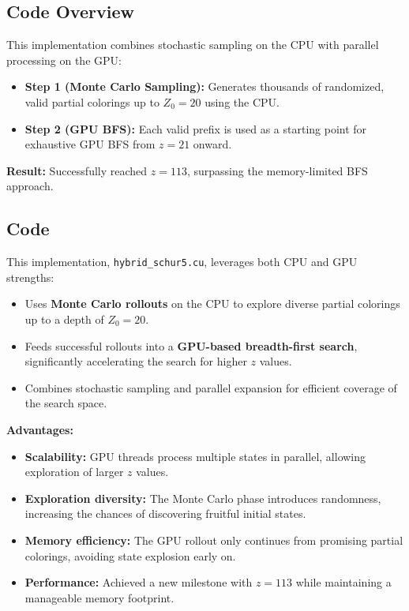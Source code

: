 \documentclass[12pt]{article}
\begin{document}
\subsection*{Code Overview}
This implementation combines stochastic sampling on the CPU with parallel processing on the GPU:
\begin{itemize}
    \item \textbf{Step 1 (Monte Carlo Sampling):} Generates thousands of randomized, valid partial colorings up to $Z_0 = 20$ using the CPU.
    \item \textbf{Step 2 (GPU BFS):} Each valid prefix is used as a starting point for exhaustive GPU BFS from $z = 21$ onward.
\end{itemize}

\textbf{Result:} Successfully reached \textbf{$z = 113$}, surpassing the memory-limited BFS approach.

\subsection*{Code}
This implementation, \texttt{hybrid\_schur5.cu}, leverages both CPU and GPU strengths:
\begin{itemize}
    \item Uses \textbf{Monte Carlo rollouts} on the CPU to explore diverse partial colorings up to a depth of $Z_0 = 20$.
    \item Feeds successful rollouts into a \textbf{GPU-based breadth-first search}, significantly accelerating the search for higher $z$ values.
    \item Combines stochastic sampling and parallel expansion for efficient coverage of the search space.
\end{itemize}

\textbf{Advantages:}
\begin{itemize}
    \item \textbf{Scalability:} GPU threads process multiple states in parallel, allowing exploration of larger $z$ values.
    \item \textbf{Exploration diversity:} The Monte Carlo phase introduces randomness, increasing the chances of discovering fruitful initial states.
    \item \textbf{Memory efficiency:} The GPU rollout only continues from promising partial colorings, avoiding state explosion early on.
    \item \textbf{Performance:} Achieved a new milestone with \textbf{$z = 113$} while maintaining a manageable memory footprint.
\end{itemize}
\end{document}
